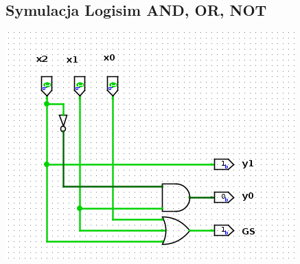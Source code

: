 \documentclass[a4paper, 11pt]{article}
\begin{document}
\subsection{Symulacja Logisim AND, OR, NOT}\label{sub:symulacja_logisim} %
\includegraphics[scale = 0.75]{images/and_or_not.png}
\end{document}

